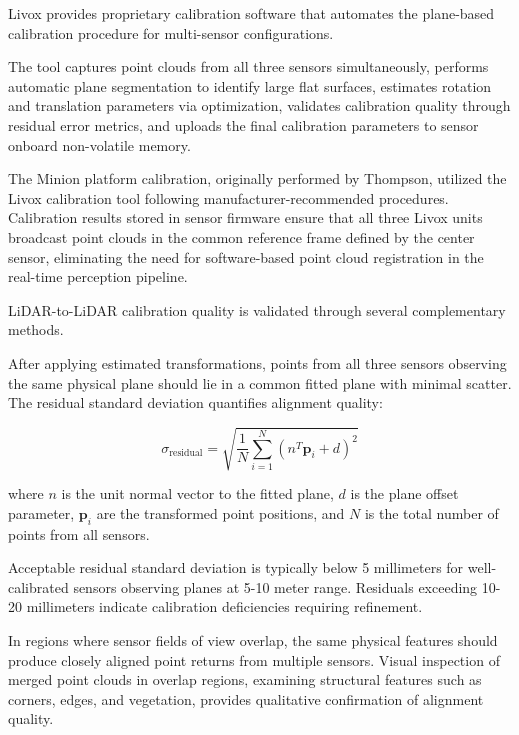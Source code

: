 
Livox provides proprietary calibration software that automates the plane-based calibration procedure for multi-sensor configurations.

The tool captures point clouds from all three sensors simultaneously, performs automatic plane segmentation to identify large flat surfaces, estimates rotation and translation parameters via optimization, validates calibration quality through residual error metrics, and uploads the final calibration parameters to sensor onboard non-volatile memory.

The Minion platform calibration, originally performed by Thompson, utilized the Livox calibration tool following manufacturer-recommended procedures.
Calibration results stored in sensor firmware ensure that all three Livox units broadcast point clouds in the common reference frame defined by the center sensor, eliminating the need for software-based point cloud registration in the real-time perception pipeline.


LiDAR-to-LiDAR calibration quality is validated through several complementary methods.


After applying estimated transformations, points from all three sensors observing the same physical plane should lie in a common fitted plane with minimal scatter.
The residual standard deviation quantifies alignment quality:

$$\sigma_{\text{residual}} = \sqrt{\frac{1}{N}\sum_{i=1}^{N} (n^T \mathbf{p}_i + d)^2}$$

where $n$ is the unit normal vector to the fitted plane, $d$ is the plane offset parameter, $\mathbf{p}_i$ are the transformed point positions, and $N$ is the total number of points from all sensors.

Acceptable residual standard deviation is typically below 5 millimeters for well-calibrated sensors observing planes at 5-10 meter range.
Residuals exceeding 10-20 millimeters indicate calibration deficiencies requiring refinement.


In regions where sensor fields of view overlap, the same physical features should produce closely aligned point returns from multiple sensors.
Visual inspection of merged point clouds in overlap regions, examining structural features such as corners, edges, and vegetation, provides qualitative confirmation of alignment quality.


